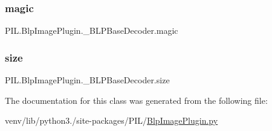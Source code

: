 \subsubsection{\texorpdfstring{magic}{magic}}
{\footnotesize\ttfamily P\+I\+L.\+Blp\+Image\+Plugin.\+\_\+\+B\+L\+P\+Base\+Decoder.\+magic}

\mbox{\label{classPIL_1_1BlpImagePlugin_1_1__BLPBaseDecoder_a818076499fc94a1ceebb1e3058795451}} 
\subsubsection{\texorpdfstring{size}{size}}
{\footnotesize\ttfamily P\+I\+L.\+Blp\+Image\+Plugin.\+\_\+\+B\+L\+P\+Base\+Decoder.\+size}



The documentation for this class was generated from the following file\+:\begin{DoxyCompactItemize}
\item 
venv/lib/python3./site-\/packages/\+P\+I\+L/\hyperlink{BlpImagePlugin_8py}{Blp\+Image\+Plugin.\+py}\end{DoxyCompactItemize}
